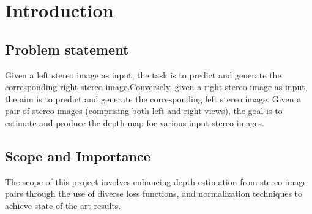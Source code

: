 \documentclass[12pt,a4paper]{report}
\begin{document}
\newpage



\renewcommand{\contentsname}{Table of Contents}
\tableofcontents
\listoffigures
{}
\listoftables
{}

\newpage


\pagestyle{fancy}
\fancyhf{}
\renewcommand{\headrulewidth}{0.5pt}
\renewcommand{\footrulewidth}{0.5pt}




\chapter{Introduction}
\par

\section{Problem statement }
Given a left stereo image as input, the task is to predict and generate the corresponding
right stereo image.Conversely, given a right stereo image as input, the aim is to predict and
generate the corresponding left stereo image.
Given a pair of stereo images (comprising both left and right views), the goal is to
estimate and produce the depth map for various input stereo images.



\section{Scope and Importance}
The scope of this project involves enhancing depth estimation from stereo image pairs
through the use of diverse loss functions, and normalization techniques to achieve state-of-the-art results.
\end{document}
